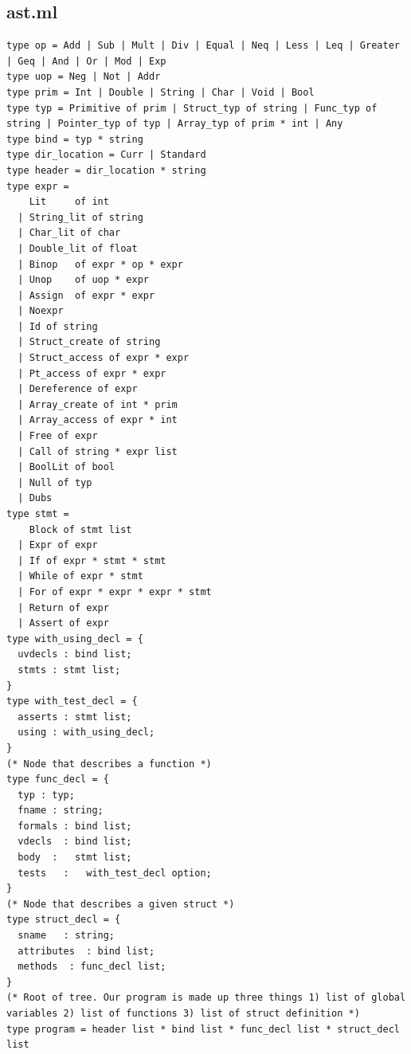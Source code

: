 \documentclass{article}
\begin{document}
\subsection{ast.ml}
\begin{lstlisting}
type op = Add | Sub | Mult | Div | Equal | Neq | Less | Leq | Greater | Geq | And | Or | Mod | Exp
type uop = Neg | Not | Addr
type prim = Int | Double | String | Char | Void | Bool
type typ = Primitive of prim | Struct_typ of string | Func_typ of string | Pointer_typ of typ | Array_typ of prim * int | Any 
type bind = typ * string
type dir_location = Curr | Standard
type header = dir_location * string
type expr =
    Lit     of int
  | String_lit of string
  | Char_lit of char
  | Double_lit of float
  | Binop   of expr * op * expr
  | Unop    of uop * expr
  | Assign  of expr * expr
  | Noexpr
  | Id of string
  | Struct_create of string
  | Struct_access of expr * expr
  | Pt_access of expr * expr 
  | Dereference of expr
  | Array_create of int * prim
  | Array_access of expr * int
  | Free of expr
  | Call of string * expr list
  | BoolLit of bool
  | Null of typ
  | Dubs 
type stmt =
    Block of stmt list   
  | Expr of expr
  | If of expr * stmt * stmt
  | While of expr * stmt
  | For of expr * expr * expr * stmt
  | Return of expr
  | Assert of expr
type with_using_decl = {
  uvdecls : bind list;
  stmts : stmt list;
}
type with_test_decl = {
  asserts : stmt list;
  using : with_using_decl; 
}
(* Node that describes a function *)
type func_decl = {
  typ : typ;
  fname : string;
  formals : bind list;
  vdecls  : bind list;
  body  :   stmt list;
  tests   :   with_test_decl option; 
}
(* Node that describes a given struct *)
type struct_decl = {
  sname   : string;
  attributes  : bind list;
  methods  : func_decl list;
}
(* Root of tree. Our program is made up three things 1) list of global variables 2) list of functions 3) list of struct definition *)
type program = header list * bind list * func_decl list * struct_decl list
\end{lstlisting}
\newpage
\end{document}
